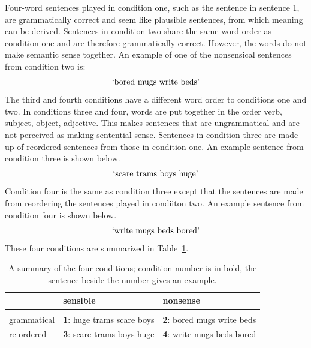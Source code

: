 \documentclass[10pt,letterpaper]{article}
\begin{document}
Four-word sentences played in condition one, such as the sentence in
sentence 1, are grammatically correct and seem like plausible
sentences, from which meaning can be derived. Sentences in condition two share the same
word order as condition one and are therefore grammatically correct.
However, the words do not make semantic sense together. An example of
one of the nonsensical sentences from condition two is:
%
%
%
\begin{equation}
\label{eq:nonsensical_sentence}
\text{\lq{}bored mugs write beds\rq{}}
\end{equation}
%
The third and fourth conditions have a different word order to
conditions one and two. In conditions three and four, words are put
together in the order verb, subject, object, adjective. This makes
sentences that are ungrammatical and are not perceived as making
sentential sense. Sentences in condition three are made up of
reordered sentences from those in condition one. An example sentence
from condition three is shown below.
%
\begin{equation}
\label{eq:sensical_sentence_ctrl}
\text{\lq{}scare trams boys huge\rq{}}
\end{equation}
%
%
Condition four is the same as condition three except that the
sentences are made from reordering the sentences played in condiiton
two. An example sentence from condition four is shown below.
%
\begin{equation}
\label{eq:nonsensical_sentence_ctrl}
\text{\lq{}write mugs beds bored\rq{}}
\end{equation}
%
These four conditions are summarized in Table~\ref{tab:conditions}.

\begin{table}
\begin{tabular}{l|ll}
&sensible&nonsense\\
\hline\\
grammatical&\textbf{1}: huge trams scare boys&\textbf{2}: bored mugs write beds\\
re-ordered &\textbf{3}: scare trams boys huge&\textbf{4}: write mugs beds bored
\end{tabular}
\caption{A summary of the four conditions; condition number is in
  bold, the sentence beside the number gives an
  example.\label{tab:conditions}}
\end{table}
\end{document}
